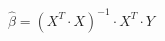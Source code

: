 \documentclass[10pt]{article}
\begin{document}
\begin{align*}\hat{\beta} = (X^{T} \cdot X)^{-1} \cdot X^{T} \cdot Y\end{align*}
\end{document}
